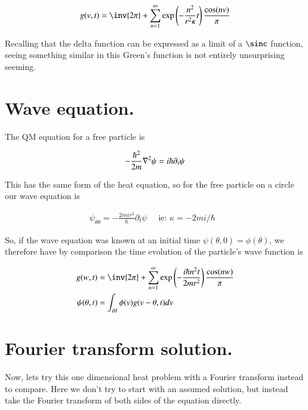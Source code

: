 \begin{align*}
g( v , t ) &= \inv{2 \pi} + \sum_{n=1}^\infty \exp\left(- \frac{n^2}{ r^2 \kappa } t \right) \frac{\cos(n v )}{\pi} \\
\end{align*}

Recalling that the delta function can be expressed as a limit of a $\sinc$ function, seeing something similar
in this Green's function is not entirely unsurprising seeming.

\section{Wave equation. }

The QM equation for a free particle is

\begin{align}\label{eqn:heat_fourier:schro}
-\frac{\hbar^2}{2m} \nabla^2 \psi = i \hbar \partial_t \psi
\end{align}

This has the same form of the heat equation, so for the free particle on a circle our wave equation is

\begin{align*}
\psi_{\theta\theta} = - \frac{2 m i r^2 }{\hbar} \partial_t \psi \quad \mbox{ ie: $\kappa = - 2 m i /\hbar$ }
\end{align*}

So, if the wave equation was known at an initial time $\psi(\theta, 0) = \phi(\theta)$, we therefore have by comparison the time evolution of the particle's wave function is

\begin{align*}
g( w, t ) &= \inv{2 \pi} + \sum_{n=1}^\infty \exp\left(- \frac{i \hbar n^2 t}{ 2 m r^2 } \right) \frac{\cos(n w )}{\pi} \\
\psi(\theta, t) &= \int_{\partial I} \phi(v) g(v - \theta, t) dv 
\end{align*}


\section{Fourier transform solution. }

Now, lets try this one dimensional heat problem with a Fourier transform instead to compare.  Here we don't try to start with an
assumed solution, but instead take the Fourier transform of both sides of the equation directly.

